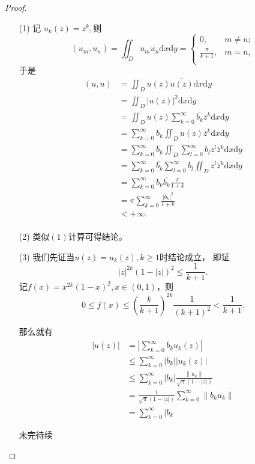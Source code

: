 \begin{proof}
\begin{enumerate}
\item[(1)]记 $u_k(z)=z^k,$则
$$
(u_m,u_n)=\iint_Du_m\overline{u_n}\mathrm{d}x\mathrm{d}y=\begin{cases}
0,&m\neq n;\\
\frac{\pi}{k+1},&m=n,\\
\end{cases}
$$
于是
\begin{align*}
(u,u)&=\iint_Du(z)\overline{u(z)}\mathrm{d}x\mathrm{d}y\\
&=\iint_D|u(z)|^2\mathrm{d}x\mathrm{d}y\\
&=\iint_Du(z)\sum_{k=0}^{\infty}\overline{b_k}\overline{z}^k\mathrm{d}x\mathrm{d}y\\
&=\sum_{k=0}^{\infty}\overline{b_k}\iint_Du(z)\overline{z}^k\mathrm{d}x\mathrm{d}y\\
&=\sum_{k=0}^{\infty}\overline{b_k}\iint_D\sum_{l=0}^{\infty}b_lz^l\overline{z}^k\mathrm{d}x\mathrm{d}y\\
&=\sum_{k=0}^{\infty}\overline{b_k}\sum_{l=0}^{\infty}b_l\iint_Dz^l\overline{z}^k\mathrm{d}x\mathrm{d}y\\
&=\sum_{k=0}^{\infty}b_k\overline{b_k}\frac{\pi}{1+k}\\
&=\pi\sum_{k=0}^{\infty}\frac{|b_k|^2}{1+k}\\
&<+\infty.\\
\end{align*}
\item[(2)]类似$(1)$计算可得结论。
\item[(3)]我们先证当$u(z)=u_k(z),k\geq1$时结论成立，
即证$$|z|^{2k}(1-|z|)^2\leq\frac{1}{k+1}.$$
记$f(x)=x^{2k}(1-x)^2,x\in(0,1)$，则
$$0\leq f(x)\leq(\frac{k}{k+1})^{2k}\frac{1}{(k+1)^2}<\frac{1}{k+1}.$$

那么就有
\begin{align*}
|u(z)|&=|\sum_{k=0}^{\infty}b_ku_k(z)|\\
&\leq\sum_{k=0}^{\infty}|b_k||u_k(z)|\\
&\leq\sum_{k=0}^{\infty}|b_k|\frac{\|u_k\|}{\sqrt{\pi}(1-|z|)}\\
&=\frac{1}{\sqrt{\pi}(1-|z|)}\sum_{k=0}^{\infty}\|b_ku_k\|\\
&=\sum_{k=0}^{\infty}|b_k
\end{align*}


未完待续
\end{enumerate}
\end{proof}




